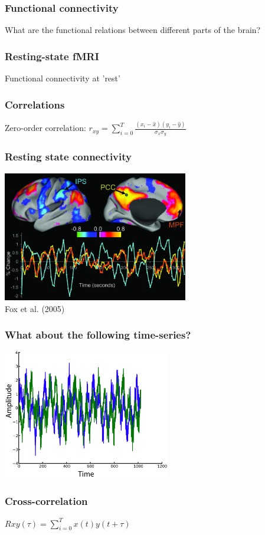 \documentclass{beamer}
\begin{document}
\begin{frame}
\frametitle{Functional connectivity}
What are the functional relations between different parts of the brain?
\end{frame}

\begin{frame}
\frametitle{Resting-state fMRI}
Functional connectivity at 'rest'
\end{frame}

\begin{frame}
\frametitle{Correlations}
\pause
Zero-order correlation:
\pause
$r_{xy} = \sum_{i=0}^{T}{\frac{(x_i-\hat{x})(y_i-\hat{y})}{\sigma_x \sigma_y}}$
\end{frame}

\begin{frame}
\frametitle{Resting state connectivity}
\includegraphics[height=5.7cm]{figures/fox_et_al}
\\
\hfill
Fox et al. (2005)
\end{frame}

\begin{frame}
\frametitle{What about the following time-series?}
\includegraphics[height=5.7cm]{figures/outa_phase_tseries}
\end{frame}

\begin{frame}
\frametitle{Cross-correlation}
$Rxy(\tau) = \sum_{i=0}^{T}{x(t)y(t+\tau)}$
\end{frame}
\end{document}
